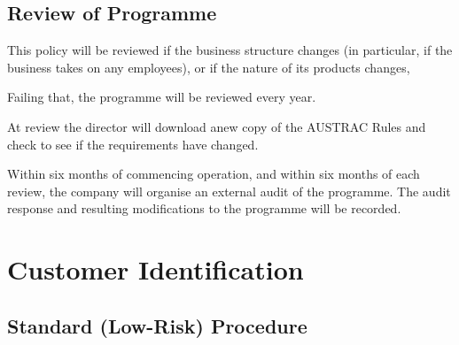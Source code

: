 \documentclass[12pt]{report}
\begin{document}
\section{Review of Programme}

This policy will be reviewed if the business structure changes (in particular, if the business takes on any
employees), or if the nature of its products changes,

Failing that, the programme will be reviewed every year.

At review the director will download anew copy of the AUSTRAC Rules and check to see if the requirements have changed.

Within six months of commencing operation, and within six months of each review, the company will
organise an external audit of the programme. The audit response and resulting modifications to the programme will be
recorded.

\chapter{Customer Identification}

\section{Standard (Low-Risk) Procedure} \label{standard}
\end{document}

